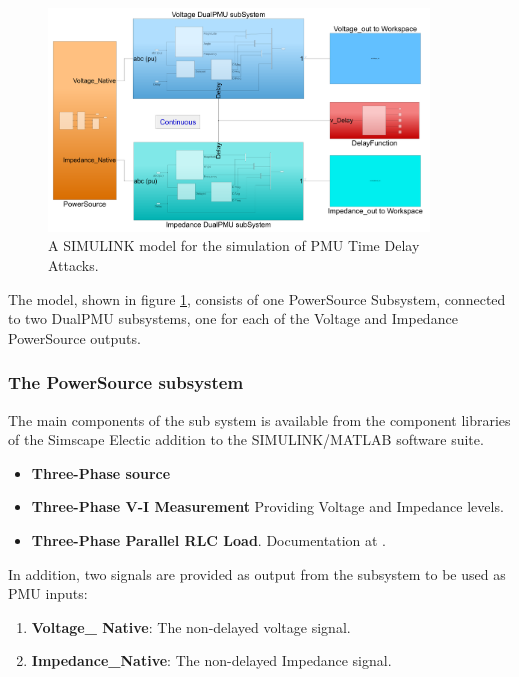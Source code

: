  \begin{figure}[t]
 \begin{center}
\includegraphics[width=0.90\textwidth]{figures/pmuSIM-overviewH.png}
\caption[PmuSIM SIMULINK model]{A SIMULINK model for the simulation of PMU Time Delay Attacks.}
\label{fig:PMUsim-Overview}
     
 \end{center}
\end{figure}

The model, shown in figure \ref{fig:PMUsim-Overview}, consists of one PowerSource Subsystem, connected to two DualPMU subsystems, one for each of the Voltage and Impedance PowerSource outputs.

\subsubsection{The PowerSource subsystem}


The main components of the sub system is available from the component libraries of the Simscape Electic addition to the SIMULINK/MATLAB software suite.

\begin{itemize}
    \item \textbf{Three-Phase source} 
    \item \textbf{Three-Phase V-I Measurement}  Providing Voltage and Impedance levels.
    \item \textbf{Three-Phase Parallel RLC Load}. Documentation at \cite{mathworksImplementThreephase}. 
\end{itemize}
In addition, two signals are provided as output from the subsystem to be used as PMU inputs:
\begin{enumerate}
    \item \textbf{Voltage\_ Native}: The non-delayed voltage signal.
    \item \textbf{Impedance\_Native}: The non-delayed Impedance signal.
\end{enumerate}

